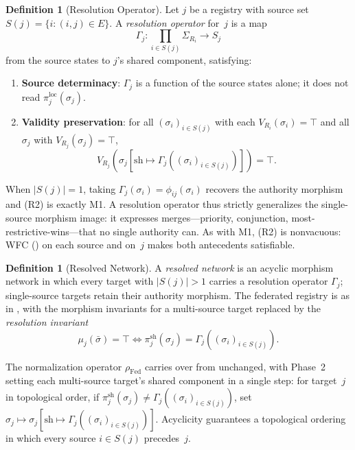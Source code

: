 \documentclass[11pt,a4paper]{article}
\theoremstyle{plain}
\theoremstyle{definition}
\newtheorem{definition}[theorem]{Definition}
\theoremstyle{remark}
\newcommand{\Fed}{\mathrm{Fed}}
\renewcommand{\_}{\textunderscore\allowbreak}
\begin{document}
\begin{definition}[Resolution Operator]
\label{def:resolver}
Let $j$ be a registry with source set $S(j) = \{i : (i,j) \in E\}$.  A
\emph{resolution operator} for~$j$ is a map
\[
  \Gamma_j : \textstyle\prod_{i \in S(j)} \Sigma_{R_i} \longrightarrow S_j
\]
from the source states to $j$'s shared component, satisfying:
\begin{enumerate}[leftmargin=*,nosep,label=(R\arabic*)]
\item \textbf{Source determinacy}: $\Gamma_j$ is a function of the source states
  alone; it does not read $\pi_j^{\mathrm{loc}}(\sigma_j)$.
\item \textbf{Validity preservation}: for all $(\sigma_i)_{i \in S(j)}$ with
  each $V_{R_i}(\sigma_i) = \top$ and all $\sigma_j$ with
  $V_{R_j}(\sigma_j) = \top$,
  \[
    V_{R_j}\!\left(\sigma_j[\mathrm{sh} \mapsto
      \Gamma_j((\sigma_i)_{i \in S(j)})]\right) = \top .
  \]
\end{enumerate}
When $|S(j)| = 1$, taking $\Gamma_j(\sigma_i) = \phi_{ij}(\sigma_i)$ recovers the
authority morphism and (R2) is exactly M1.  A resolution operator thus strictly
generalizes the single-source morphism image: it expresses merges---priority,
conjunction, most-restrictive-wins---that no single authority can.
As with M1, (R2) is nonvacuous: WFC () on each source and on~$j$
makes both antecedents satisfiable.
\end{definition}

\begin{definition}[Resolved Network]
\label{def:resolved-network}
A \emph{resolved network} is an acyclic morphism network in which every target
with $|S(j)| > 1$ carries a resolution operator $\Gamma_j$; single-source targets
retain their authority morphism.  The federated registry is as in
, with the morphism invariants for a multi-source target
replaced by the \emph{resolution invariant}
\[
  \mu_j(\bar{\sigma}) = \top \iff
  \pi_j^{\mathrm{sh}}(\sigma_j) = \Gamma_j((\sigma_i)_{i \in S(j)}) .
\]
\end{definition}

The normalization operator $\rho_\Fed$ carries over from 
unchanged, with Phase~2 setting each multi-source target's shared component in a
single step: for target~$j$ in topological order, if
$\pi_j^{\mathrm{sh}}(\sigma_j) \neq \Gamma_j((\sigma_i)_{i \in S(j)})$, set
$\sigma_j \mapsto \sigma_j[\mathrm{sh} \mapsto \Gamma_j((\sigma_i)_{i \in S(j)})]$.
Acyclicity guarantees a topological ordering in which every source
$i \in S(j)$ precedes~$j$.
\end{document}
